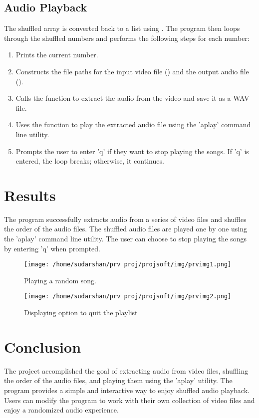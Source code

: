 \documentclass{article}
\begin{document}
\subsection{Audio Playback}
The shuffled array is converted back to a list using . The program then loops through the shuffled numbers and performs the following steps for each number:
\begin{enumerate}
  \item Prints the current number.
  \item Constructs the file paths for the input video file () and the output audio file ().
  \item Calls the  function to extract the audio from the video and save it as a WAV file.
  \item Uses the  function to play the extracted audio file using the 'aplay' command line utility.
  \item Prompts the user to enter 'q' if they want to stop playing the songs. If 'q' is entered, the loop breaks; otherwise, it continues.
\end{enumerate}

\section{Results}
The program successfully extracts audio from a series of video files and shuffles the order of the audio files. The shuffled audio files are played one by one using the 'aplay' command line utility. The user can choose to stop playing the songs by entering 'q' when prompted.



\begin{figure}[h]
  \centering
  \texttt{[image: /home/sudarshan/prv proj/projsoft/img/prvimg1.png]}
  \caption{Playing a random song.}
  \label{fig:sample}
\end{figure}


\begin{figure}[h]
  \centering
  \texttt{[image: /home/sudarshan/prv proj/projsoft/img/prvimg2.png]}
  \caption{ Displaying option to quit the playlist}
  \label{fig:sample}
\end{figure}

\section{Conclusion}
The project accomplished the goal of extracting audio from video files, shuffling the order of the audio files, and playing them using the 'aplay' utility. The program provides a simple and interactive way to enjoy shuffled audio playback. Users can modify the program to work with their own collection of video files and enjoy a randomized audio experience.
\end{document}
